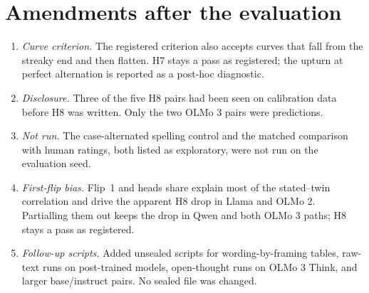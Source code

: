 \documentclass[11pt]{article}
\begin{document}
\section{Amendments after the evaluation}
\label{app:amendments}
\begin{enumerate}
  \item \emph{Curve criterion.} The registered criterion also accepts curves that fall from the streaky end and then flatten. H7 stays a pass as registered; the upturn at perfect alternation is reported as a post-hoc diagnostic.
  \item \emph{Disclosure.} Three of the five H8 pairs had been seen on calibration data before H8 was written. Only the two OLMo 3 pairs were predictions.
  \item \emph{Not run.} The case-alternated spelling control and the matched comparison with human ratings, both listed as exploratory, were not run on the evaluation seed.
  \item \emph{First-flip bias.} Flip~1 and heads share explain most of the stated--twin correlation and drive the apparent H8 drop in Llama and OLMo 2. Partialling them out keeps the drop in Qwen and both OLMo 3 paths; H8 stays a pass as registered.
  \item \emph{Follow-up scripts.} Added unsealed scripts for wording-by-framing tables, raw-text runs on post-trained models, open-thought runs on OLMo 3 Think, and larger base/instruct pairs. No sealed file was changed.
\end{enumerate}
\end{document}
